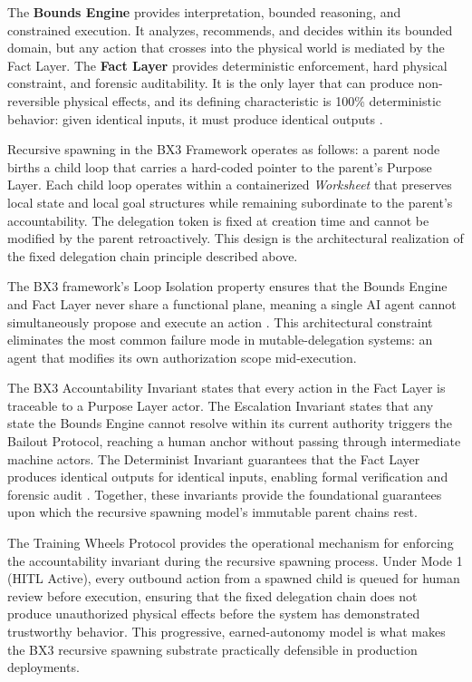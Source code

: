 The \textbf{Bounds Engine} provides interpretation, bounded reasoning, and constrained execution. It analyzes, recommends, and decides within its bounded domain, but any action that crosses into the physical world is mediated by the Fact Layer. The \textbf{Fact Layer} provides deterministic enforcement, hard physical constraint, and forensic auditability. It is the only layer that can produce non-reversible physical effects, and its defining characteristic is 100\% deterministic behavior: given identical inputs, it must produce identical outputs \cite{bx3-whitepaper-v2}.

Recursive spawning in the BX3 Framework operates as follows: a parent node births a child loop that carries a hard-coded pointer to the parent's Purpose Layer. Each child loop operates within a containerized \emph{Worksheet} that preserves local state and local goal structures while remaining subordinate to the parent's accountability. The delegation token is fixed at creation time and cannot be modified by the parent retroactively. This design is the architectural realization of the fixed delegation chain principle described above.

The BX3 framework's Loop Isolation property ensures that the Bounds Engine and Fact Layer never share a functional plane, meaning a single AI agent cannot simultaneously propose and execute an action \cite{bx3-whitepaper-v2}. This architectural constraint eliminates the most common failure mode in mutable-delegation systems: an agent that modifies its own authorization scope mid-execution.

The BX3 Accountability Invariant states that every action in the Fact Layer is traceable to a Purpose Layer actor. The Escalation Invariant states that any state the Bounds Engine cannot resolve within its current authority triggers the Bailout Protocol, reaching a human anchor without passing through intermediate machine actors. The Determinist Invariant guarantees that the Fact Layer produces identical outputs for identical inputs, enabling formal verification and forensic audit \cite{bx3-whitepaper-v2}. Together, these invariants provide the foundational guarantees upon which the recursive spawning model's immutable parent chains rest.

The Training Wheels Protocol \cite{training-wheels} provides the operational mechanism for enforcing the accountability invariant during the recursive spawning process. Under Mode 1 (HITL Active), every outbound action from a spawned child is queued for human review before execution, ensuring that the fixed delegation chain does not produce unauthorized physical effects before the system has demonstrated trustworthy behavior. This progressive, earned-autonomy model is what makes the BX3 recursive spawning substrate practically defensible in production deployments.

